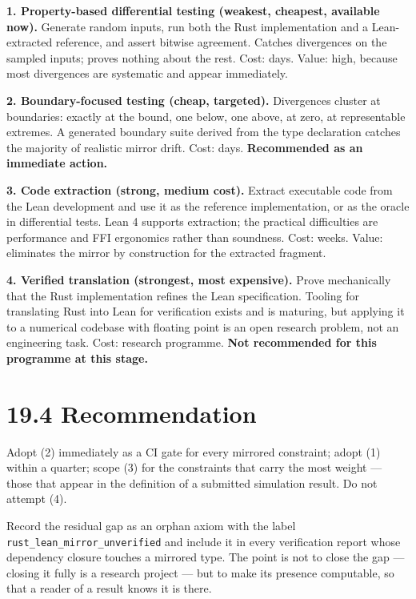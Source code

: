 \documentclass[
  11pt]{report}
\begin{document}
\textbf{1. Property-based differential testing (weakest, cheapest,
available now).} Generate random inputs, run both the Rust
implementation and a Lean-extracted reference, and assert bitwise
agreement. Catches divergences on the sampled inputs; proves nothing
about the rest. Cost: days. Value: high, because most divergences are
systematic and appear immediately.

\textbf{2. Boundary-focused testing (cheap, targeted).} Divergences
cluster at boundaries: exactly at the bound, one below, one above, at
zero, at representable extremes. A generated boundary suite derived from
the type declaration catches the majority of realistic mirror drift.
Cost: days. \textbf{Recommended as an immediate action.}

\textbf{3. Code extraction (strong, medium cost).} Extract executable
code from the Lean development and use it as the reference
implementation, or as the oracle in differential tests. Lean 4 supports
extraction; the practical difficulties are performance and FFI
ergonomics rather than soundness. Cost: weeks. Value: eliminates the
mirror by construction for the extracted fragment.

\textbf{4. Verified translation (strongest, most expensive).} Prove
mechanically that the Rust implementation refines the Lean
specification. Tooling for translating Rust into Lean for verification
exists and is maturing, but applying it to a numerical codebase with
floating point is an open research problem, not an engineering task.
Cost: research programme. \textbf{Not recommended for this programme at
this stage.}

\hypertarget{recommendation}{%
\section{19.4 Recommendation}\label{recommendation}}

Adopt (2) immediately as a CI gate for every mirrored constraint; adopt
(1) within a quarter; scope (3) for the constraints that carry the most
weight --- those that appear in the definition of a submitted simulation
result. Do not attempt (4).

Record the residual gap as an orphan axiom with the label
\texttt{rust\_lean\_mirror\_unverified} and include it in every
verification report whose dependency closure touches a mirrored type.
The point is not to close the gap --- closing it fully is a research
project --- but to make its presence computable, so that a reader of a
result knows it is there.
\end{document}
